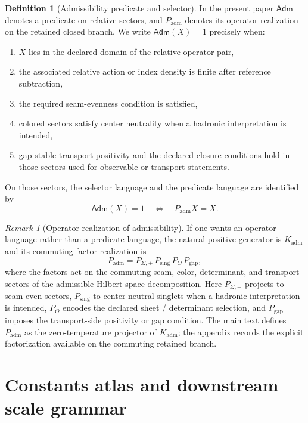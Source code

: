 \documentclass[11pt,a4paper]{article}
\theoremstyle{definition}
\newtheorem{definition}[theorem]{Definition}
\theoremstyle{remark}
\newtheorem*{remark}{Remark}
\newcommand{\Seam}{\Sigma}
\newcommand{\Kadm}{K_{\mathrm{adm}}}
\newcommand{\Padm}{P_{\mathrm{adm}}}
\begin{document}
\begin{definition}[Admissibility predicate and selector]
In the present paper $\mathsf{Adm}$ denotes a predicate on relative sectors, and $\Padm$ denotes its operator realization on the retained closed branch. We write $\mathsf{Adm}(X)=1$ precisely when:
\begin{enumerate}[label=(\arabic*), leftmargin=1.5em, topsep=3pt, itemsep=2pt]
    \item $X$ lies in the declared domain of the relative operator pair,
    \item the associated relative action or index density is finite after reference subtraction,
    \item the required seam-evenness condition is satisfied,
    \item colored sectors satisfy center neutrality when a hadronic interpretation is intended,
    \item gap-stable transport positivity and the declared closure conditions hold in those sectors used for observable or transport statements.
\end{enumerate}
On those sectors, the selector language and the predicate language are identified by
\[
\mathsf{Adm}(X)=1
\quad\Longleftrightarrow\quad
\Padm X=X.
\]
\end{definition}

\begin{remark}[Operator realization of admissibility]
If one wants an operator language rather than a predicate language, the natural positive generator is $\Kadm$ and its commuting-factor realization is
\[
P_{\mathrm{adm}}=P_{\Seam,+}\,P_{\mathrm{sing}}\,P_{\Theta}\,P_{\mathrm{gap}},
\]
where the factors act on the commuting seam, color, determinant, and transport sectors of the admissible Hilbert-space decomposition. Here $P_{\Seam,+}$ projects to seam-even sectors, $P_{\mathrm{sing}}$ to center-neutral singlets when a hadronic interpretation is intended, $P_{\Theta}$ encodes the declared sheet / determinant selection, and $P_{\mathrm{gap}}$ imposes the transport-side positivity or gap condition. The main text defines $\Padm$ as the zero-temperature projector of $\Kadm$; the appendix records the explicit factorization available on the commuting retained branch.
\end{remark}

\section{Constants atlas and downstream scale grammar}
\label{app:constants}
\end{document}
